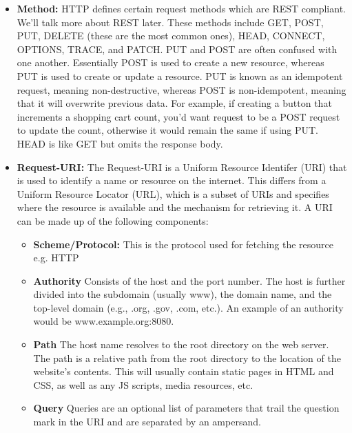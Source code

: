 \documentclass{article}
\begin{document}
\begin{itemize}

\item{%
   \textbf{Method:} HTTP defines certain request methods which are REST compliant. We'll talk more
   about REST later. These methods include GET, POST, PUT, DELETE (these are the most common ones), HEAD,
   CONNECT, OPTIONS, TRACE, and PATCH. PUT and POST are often confused with one another. Essentially POST is
   used to create a new resource, whereas PUT is used to create or update a resource. PUT is known as an
   idempotent request, meaning non-destructive, whereas POST is non-idempotent, meaning that it will
   overwrite previous data. For example, if creating a button that increments a shopping cart count, you'd
   want request to be a POST request to update the count, otherwise it would remain the same if using PUT.
   HEAD is like GET but omits the response body.
}

\item{%
   \textbf{Request-URI:} The Request-URI is a Uniform Resource Identifer (URI) that is used to
   identify a name or resource on the internet. This differs from a Uniform Resource Locator (URL), which is a
   subset of URIs and specifies where the resource is available and the mechanism for retrieving it. A URI can
   be made up of the following components:

   \begin{itemize}

   \item{%
      \textbf{Scheme/Protocol:} This is the protocol used for fetching the resource e.g. HTTP
   }

   \item{%
      \textbf{Authority} Consists of the host and the port number. The host is further divided
      into the subdomain (usually www), the domain name, and the top-level domain
      (e.g., .org, .gov, .com, etc.). An example of an authority would be www.example.org:8080.
   }

   \item{%
      \textbf{Path} The host name resolves to the root directory on the web server. The path is a
      relative path from the root directory to the location of the website's contents. This will usually
      contain static pages in HTML and CSS, as well as any JS scripts, media resources, etc.
   }

   \item{%
      \textbf{Query} Queries are an optional list of parameters that trail the question mark in
      the URI and are separated by an ampersand.
   }


\end{itemize}}
\end{itemize}
\end{document}
